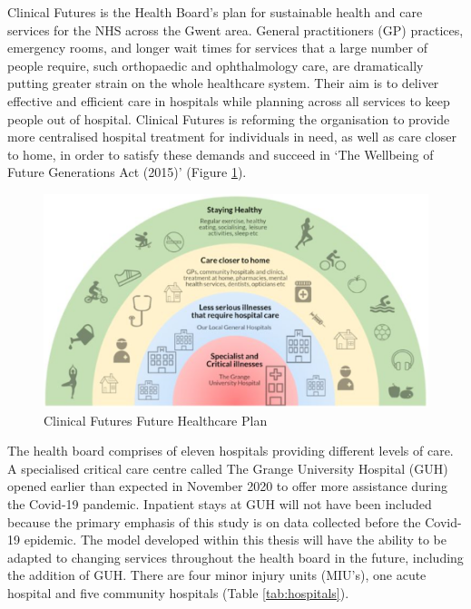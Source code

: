 \documentclass[../thesis.tex]{subfiles}
\begin{document}
Clinical Futures is the Health Board's plan for sustainable health and care services for the NHS across the Gwent area. General practitioners (GP) practices, emergency rooms, and longer wait times for services that a large number of people require, such orthopaedic and ophthalmology care, are dramatically putting greater strain on the whole healthcare system. Their aim is to deliver effective and efficient care in hospitals while planning across all services to keep people out of hospital. Clinical Futures is reforming the organisation to provide more centralised hospital treatment for individuals in need, as well as care closer to home, in order to satisfy these demands and succeed in `The Wellbeing of Future Generations Act (2015)' \cite{WelshGovernment} (Figure \ref{fig:ClinicalFutures}).

\begin{figure}[h!]
    \centering
    \includegraphics[scale=0.8]{Chapters/Chapter1/Figures/Clinical Futures.png}
    \caption{Clinical Futures Future Healthcare Plan \cite{UniAneurinBevanHealthBoard2018}}
    \label{fig:ClinicalFutures}
\end{figure}

The health board comprises of eleven hospitals providing different levels of care. A specialised critical care centre called The Grange University Hospital (GUH) opened earlier than expected in November 2020 to offer more assistance during the Covid-19 pandemic. Inpatient stays at GUH will not have been included because the primary emphasis of this study is on data collected before the Covid-19 epidemic. The model developed within this thesis will have the ability to be adapted to changing services throughout the health board in the future, including the addition of GUH.
There are four minor injury units (MIU's), one acute hospital and five community hospitals (Table \ref{tab:hospitals}).
\end{document}
